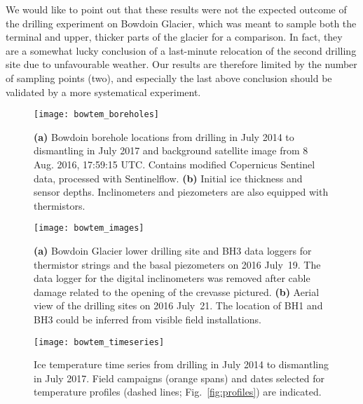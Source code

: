 \documentclass[utf8]{article}
\begin{document}
    We would like to point out that these results were not the expected outcome
    of the drilling experiment on Bowdoin Glacier, which was meant to sample
    both the terminal and upper, thicker parts of the glacier for a comparison.
    In fact, they are a somewhat lucky conclusion of a last-minute relocation
    of the second drilling site due to unfavourable weather. Our results are
    therefore limited by the number of sampling points (two), and especially
    the last above conclusion should be validated by a more systematical
    experiment.







\clearpage

    \begin{figure}
      \centerline{\texttt{[image: bowtem\_boreholes]}}
      \caption{%
        \textbf{(a)} Bowdoin borehole locations from drilling in July 2014 to
          dismantling in July 2017 and background satellite image from 8 Aug.
          2016, 17:59:15 UTC. Contains modified Copernicus Sentinel data,
          processed with Sentinelflow.
        \textbf{(b)} Initial ice thickness and sensor depths. Inclinometers
          and piezometers are also equipped with thermistors.}
      \label{fig:boreholes}
    \end{figure}

    \begin{figure}
      \centerline{\texttt{[image: bowtem\_images]}}
      \caption{%
        \textbf{(a)} Bowdoin Glacier lower drilling site and BH3 data loggers
          for thermistor strings and the basal piezometers on 2016 July~19. The
          data logger for the digital inclinometers was removed after cable
          damage related to the opening of the crevasse pictured.
        \textbf{(b)} Aerial view of the drilling sites on 2016 July~21. The
          location of BH1 and BH3 could be inferred from visible field
          installations.}
      \label{fig:images}
    \end{figure}

    \begin{figure}
      \centerline{\texttt{[image: bowtem\_timeseries]}}
      \caption{%
        Ice temperature time series from drilling in July 2014 to dismantling
        in July 2017. Field campaigns (orange spans) and dates selected for
        temperature profiles (dashed lines; Fig.~\ref{fig:profiles}) are
        indicated.}
      \label{fig:timeseries}
    \end{figure}
\end{document}

